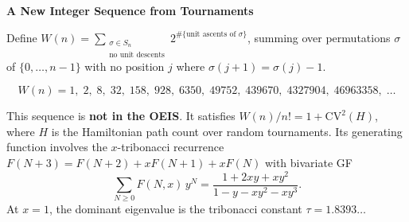 \documentclass[12pt]{article}
\begin{document}
\begin{center}
{\Large\bfseries A New Integer Sequence from Tournaments}
\end{center}

\medskip

Define $W(n) = \displaystyle\sum_{\substack{\sigma \in S_n \\ \text{no unit descents}}} 2^{\#\{\text{unit ascents of } \sigma\}}$, summing over permutations $\sigma$ of $\{0,\ldots,n{-}1\}$ with no position $j$ where $\sigma(j{+}1) = \sigma(j) - 1$.

\[
W(n) = 1,\; 2,\; 8,\; 32,\; 158,\; 928,\; 6350,\; 49752,\; 439670,\; 4327904,\; 46963358,\; \ldots
\]

This sequence is \textbf{not in the OEIS}. It satisfies $W(n)/n! = 1 + \mathrm{CV}^2(H)$, where $H$ is the Hamiltonian path count over random tournaments. Its generating function involves the $x$-tribonacci recurrence $F(N{+}3) = F(N{+}2) + xF(N{+}1) + xF(N)$ with bivariate GF
\[
\sum_{N \geq 0} F(N,x)\, y^N = \frac{1 + 2xy + xy^2}{1 - y - xy^2 - xy^3}.
\]
At $x = 1$, the dominant eigenvalue is the tribonacci constant $\tau = 1.8393\ldots$
\end{document}
